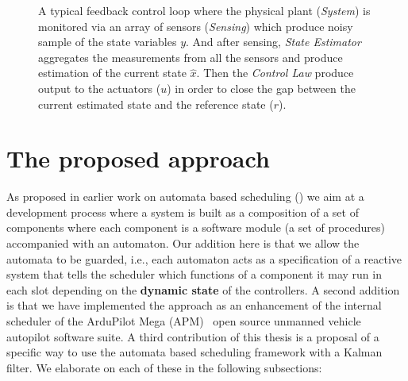 \documentclass[ twoside, 12pt ]{article}
\begin{document}
\begin{figure}[]
    \centering
    
    
    \caption{A typical feedback control loop where the physical plant (\textit{System}) is monitored via an array of sensors (\textit{Sensing}) which produce noisy sample of the state variables $y$. 
    And after sensing, \textit{State Estimator} aggregates the measurements from all the sensors and produce estimation of the current state $\hat{x}$. Then the \textit{Control Law} produce output to the actuators ($u$) in order to close the gap between the current estimated state and the reference state ($r$).
    \label{fig:control loop}}
\end{figure}

\section{The proposed approach} %
\label{sec:architecture}

As proposed in earlier work on automata based scheduling (\cite{weiss2007automata,RTComposer,AW08}) we aim at a development process where a system is built as a composition of a set of components where each component is a software module (a set of procedures) accompanied with an automaton. Our addition here is that we allow the automata to be guarded, i.e., each automaton acts as a specification of a reactive system that tells the scheduler which functions of a component it may run in each slot depending on the \textbf{dynamic state} of the controllers. A second addition is that we have implemented the approach as an enhancement of the internal scheduler of the ArduPilot Mega (APM)~\cite{APM} open source unmanned vehicle autopilot software suite. A third contribution of this thesis is a proposal of a specific way to use the automata based scheduling framework with a Kalman filter. We elaborate on each of these in the following subsections:
\end{document}
